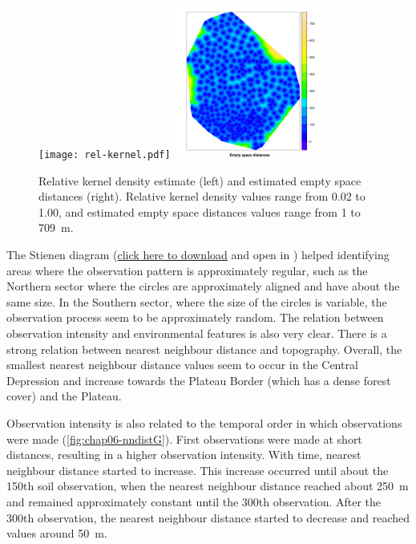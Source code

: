\begin{figure}[!ht]
 \centering
 \texttt{[image: rel-kernel.pdf]}
 \includegraphics[width=5cm]{fig/chap06-empty-space.pdf}
 \caption{Relative kernel density estimate (left) and estimated empty space distances (right). Relative kernel 
 density values range from \num{0.02} to \num{1.00}, and estimated empty space distances values range from 
 \num{1} to \SI{709}{\m}.}
\label{fig:chap06-intensity}
\end{figure}

The Stienen diagram (\href{https://drive.google.com/file/d/0B7xsLbrOA23oeG9zSWVLcnZYdEk/edit?usp=sharing}{click
here to download} and open in \googleearth) helped identifying areas where the observation pattern is 
approximately regular, such as the Northern sector where the circles are approximately aligned and have about 
the same size. In the Southern sector, where the size of the circles is variable, the observation process seem 
to be approximately random. The relation between observation intensity and environmental features is also very 
clear. There is a strong relation between nearest neighbour distance and topography. Overall, the smallest 
nearest neighbour distance values seem to occur in the Central Depression and increase towards the Plateau 
Border (which has a dense forest cover) and the Plateau.

Observation intensity is also related to the temporal order in which observations were made 
(\autoref{fig:chap06-nndistG}). First observations were made at short distances, resulting in a higher 
observation intensity. With time, nearest neighbour distance started to increase. This increase occurred until 
about the \num{150}th soil observation, when the nearest neighbour distance reached about \SI{250}{\m} and 
remained approximately constant until the \num{300}th observation. After the \num{300}th observation, the 
nearest neighbour distance started to decrease and reached values around \SI{50}{\m}.

